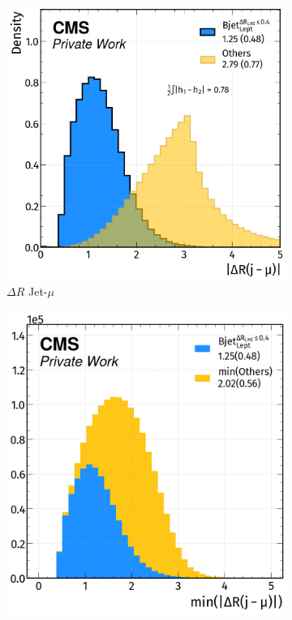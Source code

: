 \newpage
\begin{figure}[H]
    \ContinuedFloat
    \vspace{-0.5cm}
    \centering
    \begin{subfigure}{0.49\linewidth}
        \centering
        \includegraphics[width=1\linewidth]{fig//chap08-kin_reco/dr_mu.png}
        \caption{$\Delta R$ Jet-$\mu$}
    \end{subfigure}
    \hfill
    \begin{subfigure}{0.4585\linewidth}  
        \centering
        \includegraphics[width=1\linewidth]{fig//chap08-kin_reco/min_dr_mu.png}

\end{subfigure}
\end{figure}
